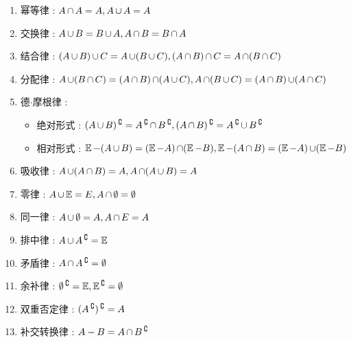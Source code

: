 {{{  \begin{enumerate}
    \item 幂等律 : $A \operatorname{\cap} A = A, A \operatorname{\cup} A = A$
    \item 交换律 : $A \operatorname{\cup} B = B \operatorname{\cup} A,A \operatorname{\cap} B = B \operatorname{\cap} A$
    \item 结合律 : $(A \operatorname{\cup} B) \operatorname{\cup} C = A \operatorname{\cup} (B \operatorname{\cup} C),(A \operatorname{\cap} B) \operatorname{\cap} C = A \operatorname{\cap} (B \operatorname{\cap} C)$
    \item 分配律 : $A \operatorname{\cup} (B \operatorname{\cap} C) = (A \operatorname{\cap} B) \operatorname{\cap} (A \operatorname{\cup} C), A \operatorname{\cap} (B \operatorname{\cup} C) = (A \operatorname{\cap} B) \operatorname{\cup} (A \operatorname{\cap} C)$
    \item 德$\cdot$摩根律 : \begin{itemize}
            \item 绝对形式 : $(A \operatorname{\cup} B)\operatorname{^\complement} = A\operatorname{^\complement} \operatorname{\cap} B\operatorname{^\complement},(A \operatorname{\cap} B)\operatorname{^\complement} = A\operatorname{^\complement} \operatorname{\cup} B\operatorname{^\complement}$
            \item 相对形式 : $\operatorname{\mathbb{E}} - (A \operatorname{\cup} B) = (\operatorname{\mathbb{E}} - A) \operatorname{\cap} (\operatorname{\mathbb{E}} - B),\operatorname{\mathbb{E}} - (A \operatorname{\cap} B) = (\operatorname{\mathbb{E}} - A) \operatorname{\cup} (\operatorname{\mathbb{E}} - B)$
          \end{itemize}
    \item 吸收律 : $A \operatorname{\cup} (A \operatorname{\cap} B) = A,A \operatorname{\cap} (A \operatorname{\cup} B) = A$
    \item 零律 : $A \operatorname{\cup} \operatorname{\mathbb{E}} = E,A \operatorname{\cap} \emptyset = \emptyset$
    \item 同一律 : $A \operatorname{\cup} \emptyset = A,A \operatorname{\cap} E = A$
    \item 排中律 : $A \operatorname{\cup} A\operatorname{^\complement} = \operatorname{\mathbb{E}}$
    \item 矛盾律 : $A \operatorname{\cap} A\operatorname{^\complement} = \emptyset$
    \item 余补律 : $\emptyset\operatorname{^\complement} = \operatorname{\mathbb{E}},\operatorname{\mathbb{E}}\operatorname{^\complement} = \emptyset$
    \item 双重否定律 : $(A\operatorname{^\complement})\operatorname{^\complement} = A$
    \item 补交转换律 : $A - B = A \operatorname{\cap} B\operatorname{^\complement}$
  \end{enumerate}
}%

}}
